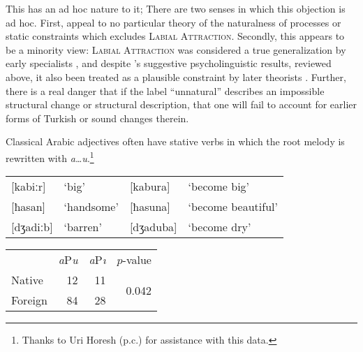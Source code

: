 This has an ad hoc nature to it; 
There are two senses in which this objection is ad hoc. 
First, \citeauthor{Becker2011} appeal to no particular theory of the naturalness of processes or static constraints which excludes \textsc{Labial Attraction}. 
Secondly, this appears to be a minority view: \textsc{Labial Attraction} was considered a true generalization by early specialists
\citep[e.g.,][]{Lees1966a}, and despite \citeauthor{Zimmer1969}'s suggestive psycholinguistic results, reviewed above, it also been treated as a plausible constraint by later theorists \citep[e.g.,][]{NiChiosain1993,Ito1993,Ito1995a,Zuraw2000}.
Further, there is a real danger that if the label ``unnatural'' 
describes an impossible structural change or structural description, that one will fail to account for earlier forms of Turkish or sound changes therein.

Classical Arabic adjectives often have stative verbs in which the root melody is rewritten with \emph{a\ldots{}u}.\footnote{Thanks to Uri Horesh (p.c.) for assistance with this data.}

\begin{example}
\begin{tabular}{l l l l}
\hspace{0pt}[kabiːr]  & `big'      & [kabura]  & `become big'       \\
\hspace{0pt}[ħasan]   & `handsome' & [ħasuna]  & `become beautiful' \\
\hspace{0pt}[dʒadiːb] & `barren'   & [dʒaduba] & `become dry'       \\
\end{tabular}
\end{example}

 
\citet{Inkelas2001}

\begin{example}
\begin{tabular}{l r r r}
        & \emph{a}P\emph{u} & \emph{a}P\emph{ı} & $p$-value \\
Native  & 12                & 11                & \multirow{2}{*}{0.042} \\
Foreign & 84                & 28                \\
\end{tabular}
\end{example}

